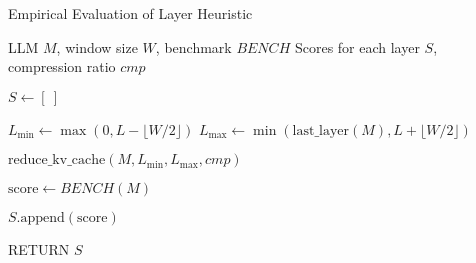 \begin{algorithm}
\caption{Empirical Evaluation of Layer Heuristic}
\begin{algorithmic}[1]
\REQUIRE LLM $M$, window size $W$, benchmark $BENCH$
\ENSURE Scores for each layer $S$, compression ratio $cmp$

\STATE $S \gets [\ ]$ 

    \STATE $L_{\text{min}} \gets \max(0, L - \lfloor W/2 \rfloor)$
    \STATE $L_{\text{max}} \gets \min(\text{last\_layer}(M), L + \lfloor W/2 \rfloor)$

    \STATE $\text{reduce\_kv\_cache}(M, L_{\text{min}}, L_{\text{max}}, cmp)$ 

    \STATE $\text{score} \gets BENCH(M)$ 

    \STATE $S.\text{append}(\text{score})$
\ENDFOR

\STATE RETURN $S$

\end{algorithmic}
\label{alg:layer_empirical}
\end{algorithm}

